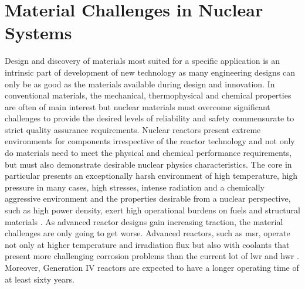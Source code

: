 \section{Material Challenges in Nuclear Systems}
	Design and discovery of materials most suited for a specific application is an intrinsic part of development of new technology as many engineering designs can only be as good as the materials available during design and innovation. In conventional materials, the mechanical, thermophysical and chemical properties are often of main interest but nuclear materials must overcome significant challenges to provide the desired levels of reliability and safety commensurate to strict quality assurance requirements. Nuclear reactors present extreme environments for components irrespective of the reactor technology and not only do materials need to meet the physical and chemical performance requirements, but must also demonstrate desirable nuclear physics characteristics. The core in particular presents an exceptionally harsh environment of high temperature, high pressure in many cases, high stresses, intense radiation and a chemically aggressive environment and the properties desirable from a nuclear perspective, such as high power density, exert high operational burdens on fuels and structural materials \cite{Zinkle:2013aa}.  As advanced reactor designs gain increasing traction, the material challenges are only going to get worse. Advanced reactors, such as \gls{msr}, operate not only at higher temperature and irradiation flux but also with coolants that present more challenging corrosion problems than the current lot of \gls{lwr} and \gls{hwr} \cite{Allen:2010aa}. Moreover, Generation {IV}  reactors are expected to have a longer operating time of at least sixty years.
 
